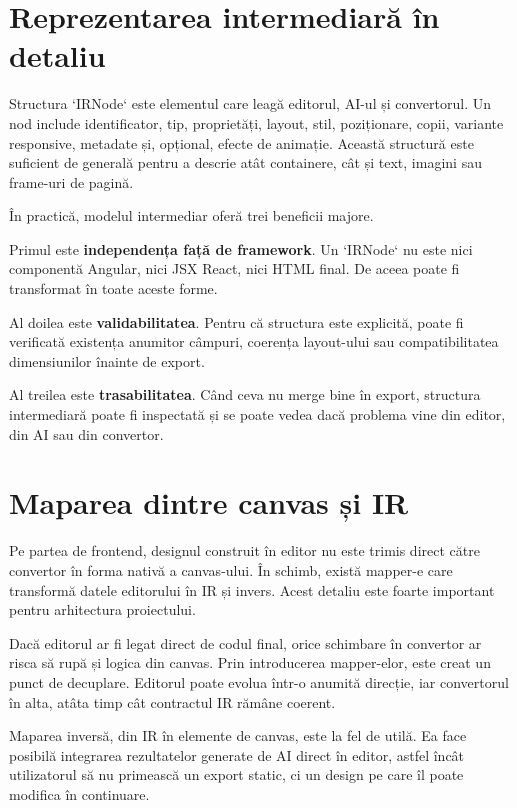 \section{Reprezentarea intermediară în detaliu}

Structura `IRNode` este elementul care leagă editorul, AI-ul și convertorul. Un nod include identificator, tip, proprietăți, layout, stil, poziționare, copii, variante responsive, metadate și, opțional, efecte de animație. Această structură este suficient de generală pentru a descrie atât containere, cât și text, imagini sau frame-uri de pagină.

În practică, modelul intermediar oferă trei beneficii majore.

Primul este \textbf{independența față de framework}. Un `IRNode` nu este nici componentă Angular, nici JSX React, nici HTML final. De aceea poate fi transformat în toate aceste forme.

Al doilea este \textbf{validabilitatea}. Pentru că structura este explicită, poate fi verificată existența anumitor câmpuri, coerența layout-ului sau compatibilitatea dimensiunilor înainte de export.

Al treilea este \textbf{trasabilitatea}. Când ceva nu merge bine în export, structura intermediară poate fi inspectată și se poate vedea dacă problema vine din editor, din AI sau din convertor.

\section{Maparea dintre canvas și IR}

Pe partea de frontend, designul construit în editor nu este trimis direct către convertor în forma nativă a canvas-ului. În schimb, există mapper-e care transformă datele editorului în IR și invers. Acest detaliu este foarte important pentru arhitectura proiectului.

Dacă editorul ar fi legat direct de codul final, orice schimbare în convertor ar risca să rupă și logica din canvas. Prin introducerea mapper-elor, este creat un punct de decuplare. Editorul poate evolua într-o anumită direcție, iar convertorul în alta, atâta timp cât contractul IR rămâne coerent.

Maparea inversă, din IR în elemente de canvas, este la fel de utilă. Ea face posibilă integrarea rezultatelor generate de AI direct în editor, astfel încât utilizatorul să nu primească un export static, ci un design pe care îl poate modifica în continuare.

